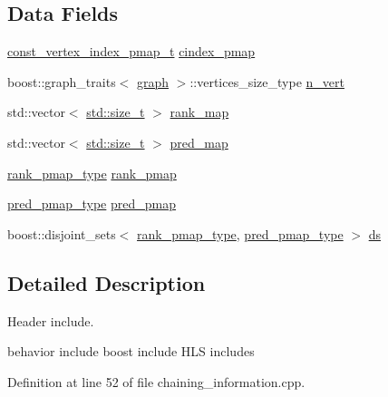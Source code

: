 \subsection*{Data Fields}
\begin{DoxyCompactItemize}
\item 
\hyperlink{structChainingSet_a770d83c8828c7b38df1925810bf31e31}{const\+\_\+vertex\+\_\+index\+\_\+pmap\+\_\+t} \hyperlink{structChainingSet_ad9d5ca88a6b3604cb70a5dabaca0753b}{cindex\+\_\+pmap}
\item 
boost\+::graph\+\_\+traits$<$ \hyperlink{structgraph}{graph} $>$\+::vertices\+\_\+size\+\_\+type \hyperlink{structChainingSet_aa8400c42fcea8f0f3dbc88d46d56b74e}{n\+\_\+vert}
\item 
std\+::vector$<$ \hyperlink{tutorial__pact__2019_2Introduction_2sixth_2test_8c_a7c94ea6f8948649f8d181ae55911eeaf}{std\+::size\+\_\+t} $>$ \hyperlink{structChainingSet_aa275e0add1bb5e825988ce58be9dbb1c}{rank\+\_\+map}
\item 
std\+::vector$<$ \hyperlink{tutorial__pact__2019_2Introduction_2sixth_2test_8c_a7c94ea6f8948649f8d181ae55911eeaf}{std\+::size\+\_\+t} $>$ \hyperlink{structChainingSet_aab628bd290de132df07992c5256d6ec9}{pred\+\_\+map}
\item 
\hyperlink{structChainingSet_aebbcd031d5f20a8ff678fff4688c9d77}{rank\+\_\+pmap\+\_\+type} \hyperlink{structChainingSet_ab988ce8b78fec747012862e62b8c598b}{rank\+\_\+pmap}
\item 
\hyperlink{structChainingSet_a0c0db2b75967dbe93b78cd1f4751c780}{pred\+\_\+pmap\+\_\+type} \hyperlink{structChainingSet_ab2bfcab43f89674f3ee1935f47721718}{pred\+\_\+pmap}
\item 
boost\+::disjoint\+\_\+sets$<$ \hyperlink{structChainingSet_aebbcd031d5f20a8ff678fff4688c9d77}{rank\+\_\+pmap\+\_\+type}, \hyperlink{structChainingSet_a0c0db2b75967dbe93b78cd1f4751c780}{pred\+\_\+pmap\+\_\+type} $>$ \hyperlink{structChainingSet_a260da22773fe71860ce535dfb3ebde4e}{ds}
\end{DoxyCompactItemize}


\subsection{Detailed Description}
Header include. 

behavior include boost include H\+LS includes 

Definition at line 52 of file chaining\+\_\+information.\+cpp.



